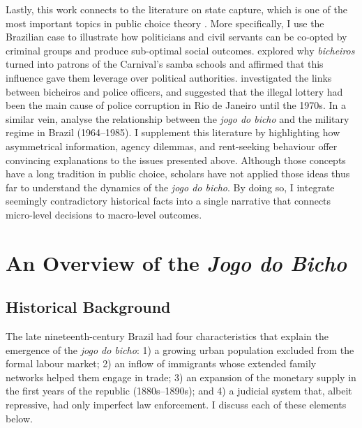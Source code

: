 \documentclass[a4paper,12pt]{article}
\begin{document}
Lastly, this work connects to the literature on state capture, which is one of the most important topics in public choice theory \citep{rose1978corruption,shleifer2002grabbing,tollison1982rent}. More specifically, I use the Brazilian case to illustrate how politicians and civil servants can be co-opted by criminal groups and produce sub-optimal social outcomes. \citet{queiroz1992carnaval} explored why \textit{bicheiros} turned into patrons of the Carnival's samba schools and affirmed that this influence gave them leverage over political authorities. \citet{misse2007illegal} investigated the links between bicheiros and police officers, and suggested that the illegal lottery had been the main cause of police corruption in Rio de Janeiro until the 1970s. In a similar vein, \citet{jupiara2015poroes} analyse the relationship between the \textit{jogo do bicho} and the military regime in Brazil (1964--1985). I supplement this literature by highlighting how asymmetrical information, agency dilemmas, and rent-seeking behaviour offer convincing explanations to the issues presented above. Although those concepts have a long tradition in public choice, scholars have not applied those ideas thus far to understand the dynamics of the \textit{jogo do bicho}. By doing so, I integrate seemingly contradictory historical facts into a single narrative that connects micro-level decisions to macro-level outcomes. 

\section{An Overview of the \textit{Jogo do Bicho}}
\label{sec:overview}

\subsection{Historical Background}
\label{sub:historical_background}

The late nineteenth-century Brazil had four characteristics that explain the emergence of the \textit{jogo do bicho}: 1) a growing urban population excluded from the formal labour market; 2) an inflow of immigrants whose extended family networks helped them engage in trade; 3) an expansion of the monetary supply in the first years of the republic (1880s--1890s); and 4) a judicial system that, albeit repressive, had only imperfect law enforcement. I discuss each of these elements below.
\end{document}
